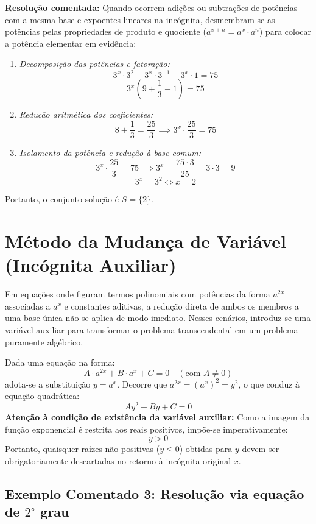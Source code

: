 \documentclass[12pt,a4paper]{report}
\begin{document}
	\textbf{Resolução comentada:}
	Quando ocorrem adições ou subtrações de potências com a mesma base e expoentes lineares na incógnita, desmembram-se as potências pelas propriedades de produto e quociente ($a^{x+n} = a^x \cdot a^n$) para colocar a potência elementar em evidência:
	\begin{enumerate}[label=\alph*)]
		\item \textit{Decomposição das potências e fatoração:}
		\[
		3^x \cdot 3^2 + 3^x \cdot 3^{-1} - 3^x \cdot 1 = 75
		\]
		\[
		3^x \left( 9 + \frac{1}{3} - 1 \right) = 75
		\]
		\item \textit{Redução aritmética dos coeficientes:}
		\[
		8 + \frac{1}{3} = \frac{25}{3} \implies 3^x \cdot \frac{25}{3} = 75
		\]
		\item \textit{Isolamento da potência e redução à base comum:}
		\[
		3^x \cdot \frac{25}{3} = 75 \implies 3^x = \frac{75 \cdot 3}{25} = 3 \cdot 3 = 9
		\]
		\[
		3^x = 3^2 \iff x = 2
		\]
	\end{enumerate}
	Portanto, o conjunto solução é $S = \{2\}$.
	
	\section{Método da Mudança de Variável (Incógnita Auxiliar)}
	\label{subsec:metodo_mudanca_variavel}
	
	Em equações onde figuram termos polinomiais com potências da forma $a^{2x}$ associadas a $a^x$ e constantes aditivas, a redução direta de ambos os membros a uma base única não se aplica de modo imediato. Nesses cenários, introduz-se uma variável auxiliar para transformar o problema transcendental em um problema puramente algébrico.
	
	\begin{destaque}
		Dada uma equação na forma:
		\[
		A \cdot a^{2x} + B \cdot a^x + C = 0 \quad (\text{com } A \neq 0)
		\]
		adota-se a substituição $y = a^x$. Decorre que $a^{2x} = (a^x)^2 = y^2$, o que conduz à equação quadrática:
		\[
		A y^2 + B y + C = 0
		\]
		\textbf{Atenção à condição de existência da variável auxiliar:} Como a imagem da função exponencial é restrita aos reais positivos, impõe-se imperativamente:
		\[
		y > 0
		\]
		Portanto, quaisquer raízes não positivas ($y \leqslant 0$) obtidas para $y$ devem ser obrigatoriamente descartadas no retorno à incógnita original $x$.
	\end{destaque}
	
	\subsection*{Exemplo Comentado 3: Resolução via equação de $2^\circ$ grau}
	
\end{document}
